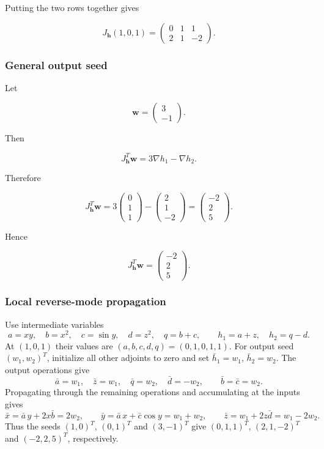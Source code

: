 \documentclass[10pt]{article}
\begin{document}
Putting the two rows together gives

\[
{
J_{\mathbf h}(1,0,1)
=
\begin{pmatrix}
0 & 1 & 1\\
2 & 1 & -2
\end{pmatrix}
}.
\]

\subsubsection*{General output seed}
Let

\[
\mathbf w
=
\begin{pmatrix}3\\-1\end{pmatrix}.
\]

Then

\[
J_{\mathbf h}^T\mathbf w
=
3\nabla h_1-\nabla h_2.
\]

Therefore

\[
J_{\mathbf h}^T\mathbf w
=
3
\begin{pmatrix}0\\1\\1\end{pmatrix}
-
\begin{pmatrix}2\\1\\-2\end{pmatrix}
=
\begin{pmatrix}-2\\2\\5\end{pmatrix}.
\]

Hence

\[
{
J_{\mathbf h}^T\mathbf w
=
\begin{pmatrix}-2\\2\\5\end{pmatrix}
}.
\]

\subsubsection*{Local reverse-mode propagation}
Use intermediate variables
\[
a=xy,\quad b=x^2,\quad c=\sin y,\quad d=z^2,\quad q=b+c,
\qquad h_1=a+z,\quad h_2=q-d.
\]
At $(1,0,1)$ their values are $(a,b,c,d,q)=(0,1,0,1,1)$. For output seed $(w_1,w_2)^T$, initialize all other adjoints to zero and set $\bar h_1=w_1$, $\bar h_2=w_2$.
The output operations give
\[
\bar a=w_1,\quad \bar z=w_1,\quad \bar q=w_2,\quad \bar d=-w_2,
\qquad \bar b=\bar c=w_2.
\]
Propagating through the remaining operations and accumulating at the inputs gives
\[
\bar x=\bar a\,y+2x\bar b=2w_2,\qquad
\bar y=\bar a\,x+\bar c\cos y=w_1+w_2,\qquad
\bar z=w_1+2z\bar d=w_1-2w_2.
\]
Thus the seeds $(1,0)^T$, $(0,1)^T$ and $(3,-1)^T$ give $(0,1,1)^T$, $(2,1,-2)^T$ and $(-2,2,5)^T$, respectively.
\par\endgroup
\end{document}
